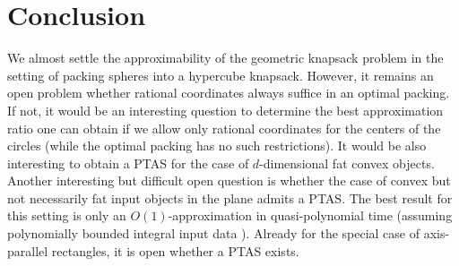 
\section{Conclusion}
\label{sec:conc} 
We almost settle the approximability of the geometric knapsack problem in the setting of 
packing spheres into a hypercube knapsack. However, it remains an open problem whether rational coordinates always suffice in an optimal packing.
If not, it would be an interesting question to determine the 
best approximation ratio one can obtain if we allow only rational coordinates for the centers of the circles (while the optimal packing has no such restrictions).
It would be also interesting to obtain a \textsf{PTAS} for the case of $d$-dimensional fat convex objects.
Another interesting but difficult open question is whether the case of convex but not necessarily fat input objects in the plane admits a \textsf{PTAS}. The best  result for this setting is only an $O(1)$-approximation in quasi-polynomial time (assuming polynomially bounded integral input data \cite{MerinoW20}).  Already for the special case of axis-parallel rectangles, it is open whether a \textsf{PTAS} exists. %
